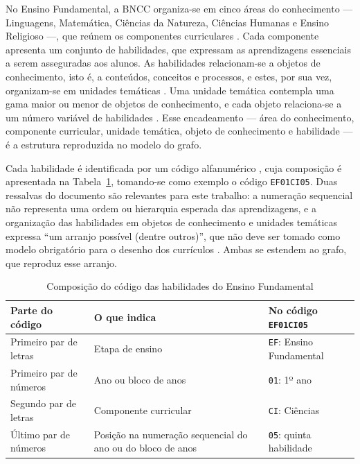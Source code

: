 No Ensino Fundamental, a BNCC organiza-se em cinco áreas do conhecimento --- Linguagens, Matemática, Ciências da Natureza, Ciências Humanas e Ensino Religioso ---, que reúnem os componentes curriculares \cite[p.~27]{brasil2018bncc}. Cada componente apresenta um conjunto de habilidades, que expressam as aprendizagens essenciais a serem asseguradas aos alunos. As habilidades relacionam-se a objetos de conhecimento, isto é, a conteúdos, conceitos e processos, e estes, por sua vez, organizam-se em unidades temáticas \cite[p.~28--29]{brasil2018bncc}. Uma unidade temática contempla uma gama maior ou menor de objetos de conhecimento, e cada objeto relaciona-se a um número variável de habilidades \cite[p.~29]{brasil2018bncc}. Esse encadeamento --- área do conhecimento, componente curricular, unidade temática, objeto de conhecimento e habilidade --- é a estrutura reproduzida no modelo do grafo.

Cada habilidade é identificada por um código alfanumérico \cite[p.~30]{brasil2018bncc}, cuja composição é apresentada na Tabela~\ref{tab:codigo-habilidade}, tomando-se como exemplo o código \texttt{EF01CI05}. Duas ressalvas do documento são relevantes para este trabalho: a numeração sequencial não representa uma ordem ou hierarquia esperada das aprendizagens, e a organização das habilidades em objetos de conhecimento e unidades temáticas expressa ``um arranjo possível (dentre outros)'', que não deve ser tomado como modelo obrigatório para o desenho dos currículos \cite[p.~31]{brasil2018bncc}. Ambas se estendem ao grafo, que reproduz esse arranjo.

\begin{table}[h]
    \centering
    \caption{Composição do código das habilidades do Ensino Fundamental}
    \label{tab:codigo-habilidade}
    \renewcommand{\arraystretch}{1.3}
    \begin{tabular}{|p{4.2cm}|p{6cm}|p{4.2cm}|}
        \hline
        \textbf{Parte do código} & \textbf{O que indica} & \textbf{No código \texttt{EF01CI05}} \\
        \hline
        Primeiro par de letras & Etapa de ensino & \texttt{EF}: Ensino Fundamental \\
        \hline
        Primeiro par de números & Ano ou bloco de anos & \texttt{01}: 1º ano \\
        \hline
        Segundo par de letras & Componente curricular & \texttt{CI}: Ciências \\
        \hline
        Último par de números & Posição na numeração sequencial do ano ou do bloco de anos & \texttt{05}: quinta habilidade \\
        \hline
    \end{tabular}
\end{table}

